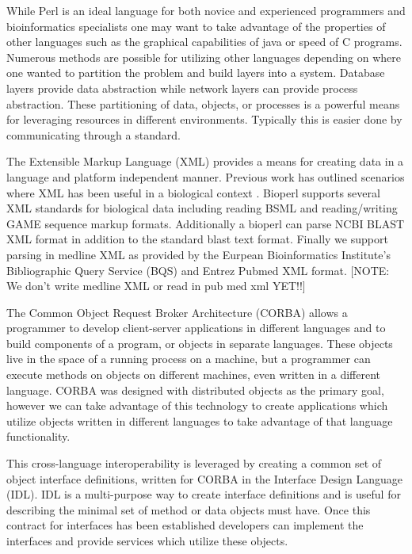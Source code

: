 \documentclass[twocolumn]{article}
\begin{document}
While Perl is an ideal language for both novice and experienced
programmers and bioinformatics specialists one may want to take
advantage of the properties of other languages such as the graphical
capabilities of java or speed of C programs.  Numerous methods are
possible for utilizing other languages depending on where one wanted
to partition the problem and build layers into a system.  Database
layers provide data abstraction while network layers can provide
process abstraction.  These partitioning of data, objects, or
processes is a powerful means for leveraging resources in different
environments.  Typically this is easier done by communicating through
a standard.  

The Extensible Markup Language (XML) provides a means for creating
data in a language and platform independent manner.  Previous work has
outlined scenarios where XML has been useful in a biological context
\cite{xml_bioinformatics}.  Bioperl supports several XML standards for
biological data including reading BSML and reading/writing GAME
sequence markup formats.  Additionally a bioperl can parse NCBI BLAST
XML format in addition to the standard blast text format.  Finally
we support parsing in medline XML as provided by the Eurpean
Bioinformatics Institute's Bibliographic Query Service (BQS) and
Entrez Pubmed XML format. [NOTE: We don't write medline XML or read in
pub med xml YET!!]

The Common Object Request Broker Architecture (CORBA) allows a
programmer to develop client-server applications in different
languages and to build components of a program, or objects in separate
languages.  These objects live in the space of a running process on a
machine, but a programmer can execute methods on objects on different
machines, even written in a different language. CORBA was designed
with distributed objects as the primary goal, however we can take
advantage of this technology to create applications which utilize
objects written in different languages to take advantage of that
language functionality.

This cross-language interoperability is leveraged by creating a common
set of object interface definitions, written for CORBA in the
Interface Design Language (IDL).  IDL is a multi-purpose way to create
interface definitions and is useful for describing the minimal set of
method or data objects must have.  Once this contract for interfaces
has been established developers can implement the interfaces and
provide services which utilize these objects. 
\end{document}
